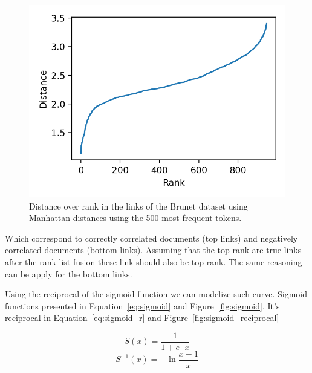 \begin{figure}
  \includegraphics[width=\linewidth]{img/distance_over_rank.png}
  \caption{Distance over rank in the links of the Brunet dataset using Manhattan distances using the 500 most frequent tokens.}
  \label{fig:distance_over_rank}
\end{figure}

Which correspond to correctly correlated documents (top links) and negatively correlated documents (bottom links).
Assuming that the top rank are true links after the rank list fusion these link should also be top rank.
The same reasoning can be apply for the bottom links.

Using the reciprocal of the sigmoid function we can modelize such curve. Sigmoid functions presented in Equation~\ref{eq:sigmoid} and Figure~\ref{fig:sigmoid}. It's reciprocal in Equation~\ref{eq:sigmoid_r} and Figure~\ref{fig:sigmoid_reciprocal}

\begin{equation}
  \label{eq:sigmoid}
  S(x) = \frac{1}{1+e^-x}
\end{equation}
\begin{equation}
  \label{eq:sigmoid_r}
  S^{-1}(x) = -\ln{\frac{x-1}{x}}
\end{equation}

